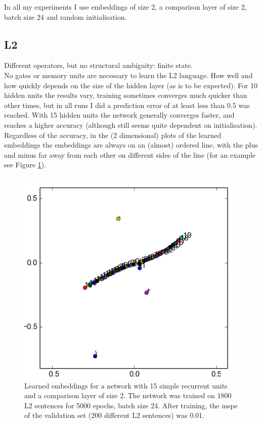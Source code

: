 \documentclass{article}
\begin{document}
\noindent In all my experiments I use embeddings of size 2, a comparison layer of size 2, batch size 24 and random initialisation.

\subsection{L2}

Different operators, but no structural ambiguity: finite state.\\

\noindent No gates or memory units are necessary to learn the L2 language. 
How well and how quickly depends on the size of the hidden layer (as is to be expected).
For 10 hidden units the results vary, training sometimes converges much quicker than other times, but in all runs I did a prediction error of at least less than 0.5 was reached.
With 15 hidden units the network generally converges faster, and reaches a higher accuracy (although still seems quite dependent on initialisation).\\

Regardless of the accuracy, in the (2 dimensional) plots of the learned embeddings the embeddings are always on an (almost) ordered line, with the plus and minus far away from each other on different sides of the line (for an example see Figure \ref{fig:L2_embeddings}).

\begin{figure}[!ht]
    \includegraphics{L2_embeddings.png}
    \caption{Learned embeddings for a network with 15 simple recurrent units and a comparison layer of size 2. The network was trained on 1800 L2 sentences for 5000 epochs, batch size 24. After training, the mspe of the validation set (200 different L2 sentences) was 0.01.}\label{fig:L2_embeddings}
\end{figure}
\end{document}
